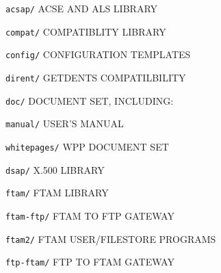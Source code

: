 \begin{bwslide}

\begin{nrtc}
\item	\verb"acsap/" ACSE AND ALS LIBRARY

\item	\verb"compat/" COMPATIBLITY LIBRARY

\item	\verb"config/" CONFIGURATION TEMPLATES 

\item	\verb"dirent/" GETDENTS COMPATILBILITY

\item	\verb"doc/" DOCUMENT SET, INCLUDING:
    \begin{nrtc}
    \item	\verb"manual/" USER'S MANUAL

    \item	\verb"whitepages/" WPP DOCUMENT SET
    \end{nrtc}

\item	\verb"dsap/" X.500 LIBRARY

\item	\verb"ftam/" FTAM LIBRARY

\item	\verb"ftam-ftp/" FTAM TO FTP GATEWAY

\item	\verb"ftam2/" FTAM USER/FILESTORE PROGRAMS

\item	\verb"ftp-ftam/" FTP TO FTAM GATEWAY
\end{nrtc}
\end{bwslide}


